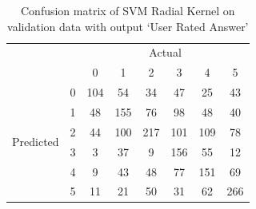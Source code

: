 \begin{table}[h!]
\caption{Confusion matrix of SVM Radial Kernel on validation data with output `User Rated Answer'}
\label{tbl_confusionmatrix_ura}
\begin{tabular}{|cc|cccccc|}
\hline
& & \multicolumn{6}{|c|}{Actual} \\
 & & 0 & 1 & 2 & 3 & 4 & 5 \\
\hline
\multirow{6}{*}{Predicted} & 0 & 104 & 54 & 34 & 47 & 25 & 43 \\
& 1 & 48 & 155 & 76 & 98 & 48 & 40 \\
& 2 & 44 & 100 & 217 & 101 & 109 & 78 \\
& 3 & 3 & 37 & 9 & 156 & 55 & 12 \\
& 4 & 9 & 43 & 48 & 77 & 151 & 69 \\
& 5 & 11 & 21 & 50 & 31 & 62 & 266 \\
\hline
\end{tabular}
\end{table}

